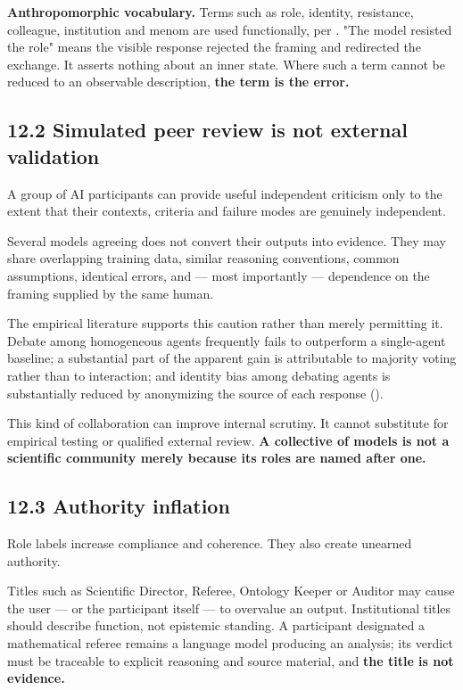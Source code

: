 \textbf{Anthropomorphic vocabulary.} Terms such as role, identity, resistance, colleague, institution and menom are used functionally, per . "The model resisted the role" means the visible response rejected the framing and redirected the exchange. It asserts nothing about an inner state. Where such a term cannot be reduced to an observable description, \textbf{the term is the error.}


\subsection*{12.2 Simulated peer review is not external validation}
\label{sec:en:12.2}

A group of AI participants can provide useful independent criticism only to the extent that their contexts, criteria and failure modes are genuinely independent.

Several models agreeing does not convert their outputs into evidence. They may share overlapping training data, similar reasoning conventions, common assumptions, identical errors, and — most importantly — dependence on the framing supplied by the same human.

The empirical literature supports this caution rather than merely permitting it. Debate among homogeneous agents frequently fails to outperform a single-agent baseline; a substantial part of the apparent gain is attributable to majority voting rather than to interaction; and \gcheck{} identity bias among debating agents is substantially reduced by anonymizing the source of each response ().

This kind of collaboration can improve internal scrutiny. It cannot substitute for empirical testing or qualified external review. \textbf{A collective of models is not a scientific community merely because its roles are named after one.}


\subsection*{12.3 Authority inflation}
\label{sec:en:12.3}

Role labels increase compliance and coherence. They also create unearned authority.

Titles such as Scientific Director, Referee, Ontology Keeper or Auditor may cause the user — or the participant itself — to overvalue an output. Institutional titles should describe function, not epistemic standing. A participant designated a mathematical referee remains a language model producing an analysis; its verdict must be traceable to explicit reasoning and source material, and \textbf{the title is not evidence.}

